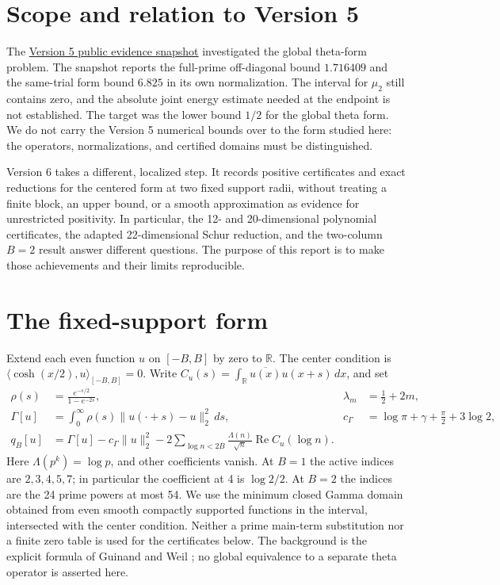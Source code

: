 \documentclass[11pt,a4paper]{article}
\numberwithin{equation}{section}
\theoremstyle{definition}\newtheorem{definition}[theorem]{Definition}
\theoremstyle{remark}\newtheorem{remark}[theorem]{Remark}
\newcommand{\R}{\mathbb R}\newcommand{\C}{\mathbb C}\newcommand{\N}{\mathbb N}
\newcommand{\ip}[2]{\langle#1,#2\rangle}\newcommand{\norm}[1]{\lVert#1\rVert}\newcommand{\abs}[1]{\lvert#1\rvert}
\begin{document}
\clearpage
\renewcommand{\thesection}{V6.\arabic{section}}
\renewcommand{\theHsection}{vsix.\arabic{section}}
\setcounter{section}{0}
\newcommand{\ArtifactURL}{https://github.com/serabing-hash/theta-weighted-certificate/tree/7822f59b00b74deff7902299bcc7cb7dbd75e19b/papers/2026-11-21-rh-project-closeout}
\newcommand{\BaselineURL}{https://github.com/serabing-hash/theta-weighted-certificate/tree/0484eecfc383fe7d4f66b38e91c62ad0002d1338/v5/2026-11-12}
\section{Scope and relation to Version 5}\label{vsix:scope}
The \href{\BaselineURL}{Version 5 public evidence snapshot} investigated the global theta-form problem. The snapshot reports the full-prime off-diagonal bound $1.716409$ and the same-trial form bound $6.825$ in its own normalization. The interval for $\mu_2$ still contains zero, and the absolute joint energy estimate needed at the endpoint is not established. The target was the lower bound $1/2$ for the global theta form. We do not carry the Version 5 numerical bounds over to the form studied here: the operators, normalizations, and certified domains must be distinguished.

Version 6 takes a different, localized step. It records positive certificates and exact reductions for the centered form at two fixed support radii, without treating a finite block, an upper bound, or a smooth approximation as evidence for unrestricted positivity. In particular, the 12- and 20-dimensional polynomial certificates, the adapted 22-dimensional Schur reduction, and the two-column $B=2$ result answer different questions. The purpose of this report is to make those achievements and their limits reproducible.

\section{The fixed-support form}
Extend each even function $u$ on $[-B,B]$ by zero to $\R$. The center condition is $\ip{\cosh(x/2)}u_{[-B,B]}=0$. Write $C_u(s)=\int_{\R}\overline{u(x)}u(x+s)\,dx$, and set
\begin{align*}
 \rho(s)&=\frac{e^{-s/2}}{1-e^{-2s}}, & \lambda_m&=\tfrac12+2m,\\
 \Gamma[u]&=\int_0^\infty\rho(s)\|u(\cdot+s)-u\|_2^2\,ds,
 & c_\Gamma&=\log\pi+\gamma+\frac\pi2+3\log2,\\
 q_B[u]&=\Gamma[u]-c_\Gamma\|u\|_2^2-
 2\!\sum_{\log n<2B}\frac{\Lambda(n)}{\sqrt n}\operatorname{Re} C_u(\log n).
\end{align*}
Here $\Lambda(p^k)=\log p$, and other coefficients vanish. At $B=1$ the active indices are $2,3,4,5,7$; in particular the coefficient at 4 is $\log2/2$. At $B=2$ the indices are the 24 prime powers at most 54. We use the minimum closed Gamma domain obtained from even smooth compactly supported functions in the interval, intersected with the center condition. Neither a prime main-term substitution nor a finite zero table is used for the certificates below. The background is the explicit formula of Guinand and Weil \cite{vsixGuinand,vsixWeil}; no global equivalence to a separate theta operator is asserted here.
\end{document}
